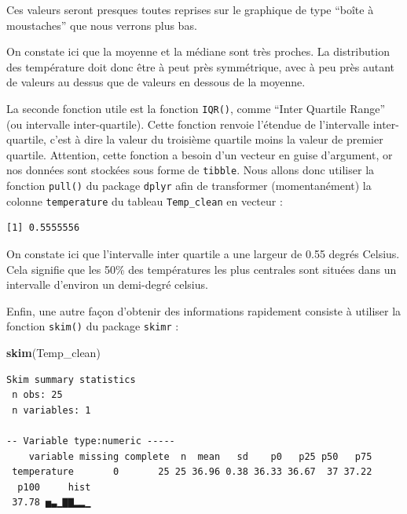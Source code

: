 \documentclass[a4paperpaper,]{article}
\newenvironment{Shaded}{\begin{snugshade}}{\end{snugshade}}
\newcommand{\KeywordTok}[1]{\textcolor[rgb]{0.12,0.11,0.11}{\textbf{#1}}}
\newcommand{\NormalTok}[1]{\textcolor[rgb]{0.12,0.11,0.11}{#1}}
\newcommand{\OperatorTok}[1]{\textcolor[rgb]{0.12,0.11,0.11}{#1}}
\newcommand{\StringTok}[1]{\textcolor[rgb]{0.75,0.01,0.01}{#1}}
\begin{document}
Ces valeurs seront presques toutes reprises sur le graphique de type ``boîte à moustaches'' que nous verrons plus bas.

On constate ici que la moyenne et la médiane sont très proches. La distribution des température doit donc être à peut près symmétrique, avec à peu près autant de valeurs au dessus que de valeurs en dessous de la moyenne.

La seconde fonction utile est la fonction \texttt{IQR()}, comme ``Inter Quartile Range'' (ou intervalle inter-quartile). Cette fonction renvoie l'étendue de l'intervalle inter-quartile, c'est à dire la valeur du troisième quartile moins la valeur de premier quartile. Attention, cette fonction a besoin d'un vecteur en guise d'argument, or nos données sont stockées sous forme de \texttt{tibble}. Nous allons donc utiliser la fonction \texttt{pull()} du package \texttt{dplyr} afin de transformer (momentanément) la colonne \texttt{temperature} du tableau \texttt{Temp\_clean} en vecteur :

\begin{Shaded}
\end{Shaded}

\begin{verbatim}
[1] 0.5555556
\end{verbatim}

On constate ici que l'intervalle inter quartile a une largeur de 0.55 degrés Celsius. Cela signifie que les 50\% des températures les plus centrales sont situées dans un intervalle d'environ un demi-degré celsius.

Enfin, une autre façon d'obtenir des informations rapidement consiste à utiliser la fonction \texttt{skim()} du package \texttt{skimr} :

\begin{Shaded}
\begin{Highlighting}[]
\KeywordTok{skim}\NormalTok{(Temp_clean)}
\end{Highlighting}
\end{Shaded}

\begin{verbatim}
Skim summary statistics
 n obs: 25 
 n variables: 1 

-- Variable type:numeric -----
    variable missing complete  n  mean   sd    p0   p25 p50   p75
 temperature       0       25 25 36.96 0.38 36.33 36.67  37 37.22
  p100     hist
 37.78 ▅▃▁▇▇▂▂▁
\end{verbatim}
\end{document}
